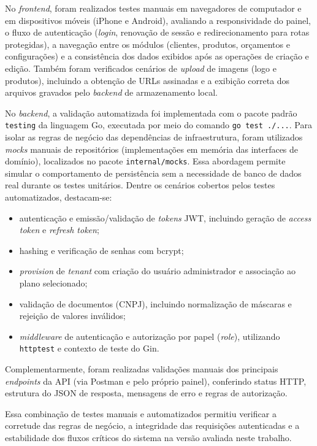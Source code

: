 No \textit{frontend}, foram realizados testes manuais em navegadores de computador e em dispositivos móveis (iPhone e Android), avaliando a responsividade do painel, o fluxo de autenticação (\textit{login}, renovação de sessão e redirecionamento para rotas protegidas), a navegação entre os módulos (clientes, produtos, orçamentos e configurações) e a consistência dos dados exibidos após as operações de criação e edição. Também foram verificados cenários de \textit{upload} de imagens (logo e produtos), incluindo a obtenção de URLs assinadas e a exibição correta dos arquivos gravados pelo \textit{backend} de armazenamento local.

No \textit{backend}, a validação automatizada foi implementada com o pacote padrão \texttt{testing} da linguagem Go, executada por meio do comando \texttt{go test ./\allowbreak{}...}. Para isolar as regras de negócio das dependências de infraestrutura, foram utilizados \textit{mocks} manuais de repositórios (implementações em memória das interfaces de domínio), localizados no pacote \texttt{internal/\allowbreak{}mocks}. Essa abordagem permite simular o comportamento de persistência sem a necessidade de banco de dados real durante os testes unitários. Dentre os cenários cobertos pelos testes automatizados, destacam-se:
\begin{itemize}
  \item autenticação e emissão/validação de \textit{tokens} JWT, incluindo geração de \textit{access token} e \textit{refresh token};
  \item hashing e verificação de senhas com bcrypt;
  \item \textit{provision} de \textit{tenant} com criação do usuário administrador e associação ao plano selecionado;
  \item validação de documentos (CNPJ), incluindo normalização de máscaras e rejeição de valores inválidos;
  \item \textit{middleware} de autenticação e autorização por papel (\textit{role}), utilizando \texttt{httptest} e contexto de teste do Gin.
\end{itemize}

Complementarmente, foram realizadas validações manuais dos principais \textit{endpoints} da API (via Postman e pelo próprio painel), conferindo status HTTP, estrutura do JSON de resposta, mensagens de erro e regras de autorização.

Essa combinação de testes manuais e automatizados permitiu verificar a corretude das regras de negócio, a integridade das requisições autenticadas e a estabilidade dos fluxos críticos do sistema na versão avaliada neste trabalho.

